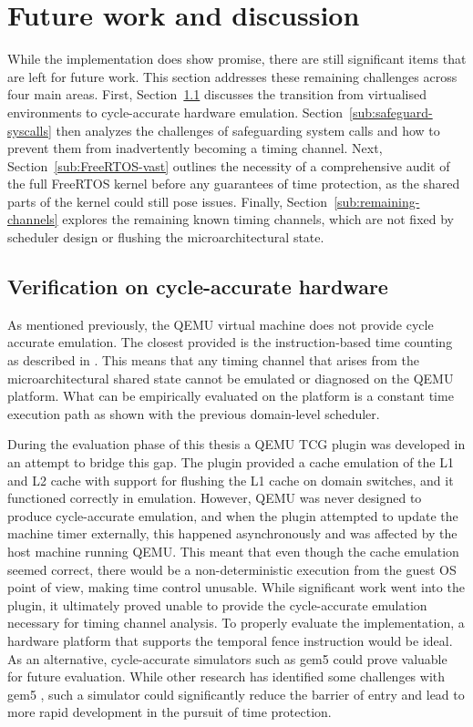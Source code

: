 \section{Future work and discussion}\label{sec:FutureWork}
While the implementation does show promise, there are still significant items
that are left for future work. This section addresses these remaining
challenges across four main areas. First, Section~\ref{sub:cycle-accurate}
discusses the transition from virtualised environments to cycle-accurate
hardware emulation. Section~\ref{sub:safeguard-syscalls} then analyzes the
challenges of safeguarding system calls and how to prevent them from
inadvertently becoming a timing channel. Next, Section~\ref{sub:FreeRTOS-vast}
outlines the necessity of a comprehensive audit of the full FreeRTOS kernel
before any guarantees of time protection, as the shared parts of the kernel
could still pose issues. Finally, Section~\ref{sub:remaining-channels} explores
the remaining known timing channels, which are not fixed by scheduler design or
flushing the microarchitectural state.

\subsection{Verification on cycle-accurate hardware}\label{sub:cycle-accurate}
As mentioned previously, the QEMU virtual machine does not provide cycle
accurate emulation. The closest provided is the instruction-based time counting
as described in \cite{TCGInstructionCounting}. This means that any timing
channel that arises from the microarchitectural shared state cannot be
emulated or diagnosed on the QEMU platform. What can be empirically evaluated
on the platform is a constant time execution path as shown with the previous
domain-level scheduler. 

During the evaluation phase of this thesis a QEMU TCG plugin was developed in
an attempt to bridge this gap. The plugin provided a cache emulation of the L1
and L2 cache with support for flushing the L1 cache on domain switches, and it
functioned correctly in emulation. However, QEMU was never designed to produce
cycle-accurate emulation, and when the plugin attempted to update the machine
timer externally, this happened asynchronously and was affected by the host
machine running QEMU. This meant that even though the cache emulation seemed
correct, there would be a non-deterministic execution from the guest OS point
of view, making time control unusable. While significant work went into the
plugin, it ultimately proved unable to provide the cycle-accurate emulation
necessary for timing channel analysis. To properly evaluate the implementation,
a hardware platform that supports the temporal fence instruction would be
ideal. As an alternative, cycle-accurate simulators such as gem5
\cite{lowe-powerGem5SimulatorVersion2020} could prove valuable for future
evaluation. While other research has identified some challenges with gem5
\cite{bossuet2023}, such a simulator could significantly reduce the barrier of
entry and lead to more rapid development in the pursuit of time protection.

